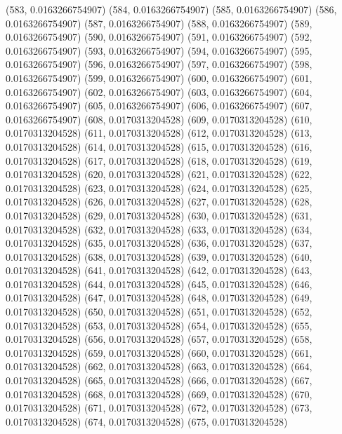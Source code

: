 {					(583, 0.0163266754907)
					(584, 0.0163266754907)
					(585, 0.0163266754907)
					(586, 0.0163266754907)
					(587, 0.0163266754907)
					(588, 0.0163266754907)
					(589, 0.0163266754907)
					(590, 0.0163266754907)
					(591, 0.0163266754907)
					(592, 0.0163266754907)
					(593, 0.0163266754907)
					(594, 0.0163266754907)
					(595, 0.0163266754907)
					(596, 0.0163266754907)
					(597, 0.0163266754907)
					(598, 0.0163266754907)
					(599, 0.0163266754907)
					(600, 0.0163266754907)
					(601, 0.0163266754907)
					(602, 0.0163266754907)
					(603, 0.0163266754907)
					(604, 0.0163266754907)
					(605, 0.0163266754907)
					(606, 0.0163266754907)
					(607, 0.0163266754907)
					(608, 0.0170313204528)
					(609, 0.0170313204528)
					(610, 0.0170313204528)
					(611, 0.0170313204528)
					(612, 0.0170313204528)
					(613, 0.0170313204528)
					(614, 0.0170313204528)
					(615, 0.0170313204528)
					(616, 0.0170313204528)
					(617, 0.0170313204528)
					(618, 0.0170313204528)
					(619, 0.0170313204528)
					(620, 0.0170313204528)
					(621, 0.0170313204528)
					(622, 0.0170313204528)
					(623, 0.0170313204528)
					(624, 0.0170313204528)
					(625, 0.0170313204528)
					(626, 0.0170313204528)
					(627, 0.0170313204528)
					(628, 0.0170313204528)
					(629, 0.0170313204528)
					(630, 0.0170313204528)
					(631, 0.0170313204528)
					(632, 0.0170313204528)
					(633, 0.0170313204528)
					(634, 0.0170313204528)
					(635, 0.0170313204528)
					(636, 0.0170313204528)
					(637, 0.0170313204528)
					(638, 0.0170313204528)
					(639, 0.0170313204528)
					(640, 0.0170313204528)
					(641, 0.0170313204528)
					(642, 0.0170313204528)
					(643, 0.0170313204528)
					(644, 0.0170313204528)
					(645, 0.0170313204528)
					(646, 0.0170313204528)
					(647, 0.0170313204528)
					(648, 0.0170313204528)
					(649, 0.0170313204528)
					(650, 0.0170313204528)
					(651, 0.0170313204528)
					(652, 0.0170313204528)
					(653, 0.0170313204528)
					(654, 0.0170313204528)
					(655, 0.0170313204528)
					(656, 0.0170313204528)
					(657, 0.0170313204528)
					(658, 0.0170313204528)
					(659, 0.0170313204528)
					(660, 0.0170313204528)
					(661, 0.0170313204528)
					(662, 0.0170313204528)
					(663, 0.0170313204528)
					(664, 0.0170313204528)
					(665, 0.0170313204528)
					(666, 0.0170313204528)
					(667, 0.0170313204528)
					(668, 0.0170313204528)
					(669, 0.0170313204528)
					(670, 0.0170313204528)
					(671, 0.0170313204528)
					(672, 0.0170313204528)
					(673, 0.0170313204528)
					(674, 0.0170313204528)
					(675, 0.0170313204528)
}
